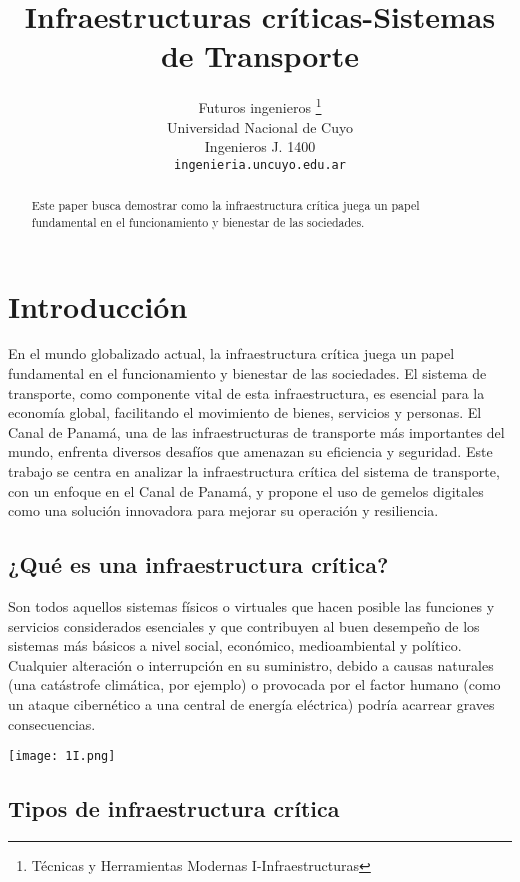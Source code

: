 \documentclass{article}
\title{Infraestructuras críticas-Sistemas de Transporte}
\author{
    Futuros ingenieros
    \thanks{Técnicas y Herramientas Modernas I-Infraestructuras}
   \\
    Universidad Nacional de Cuyo \\
  Ingenieros J. 1400 \\
  \texttt{ingenieria.uncuyo.edu.ar} \\
  }
\begin{document}
\maketitle


\begin{abstract}
Este paper busca demostrar como la infraestructura crítica juega un
papel fundamental en el funcionamiento y bienestar de las sociedades.
\end{abstract}


\pagebreak

\hypertarget{introducciuxf3n}{%
\section{Introducción}\label{introducciuxf3n}}

En el mundo globalizado actual, la infraestructura crítica juega un
papel fundamental en el funcionamiento y bienestar de las sociedades. El
sistema de transporte, como componente vital de esta infraestructura, es
esencial para la economía global, facilitando el movimiento de bienes,
servicios y personas. El Canal de Panamá, una de las infraestructuras de
transporte más importantes del mundo, enfrenta diversos desafíos que
amenazan su eficiencia y seguridad. Este trabajo se centra en analizar
la infraestructura crítica del sistema de transporte, con un enfoque en
el Canal de Panamá, y propone el uso de gemelos digitales como una
solución innovadora para mejorar su operación y resiliencia.

\hypertarget{quuxe9-es-una-infraestructura-cruxedtica}{%
\subsection{¿Qué es una infraestructura
crítica?}\label{quuxe9-es-una-infraestructura-cruxedtica}}

Son todos aquellos sistemas físicos o virtuales que hacen posible las
funciones y servicios considerados esenciales y que contribuyen al buen
desempeño de los sistemas más básicos a nivel social, económico,
medioambiental y político. Cualquier alteración o interrupción en su
suministro, debido a causas naturales (una catástrofe climática, por
ejemplo) o provocada por el factor humano (como un ataque cibernético a
una central de energía eléctrica) podría acarrear graves consecuencias.

\texttt{[image: 1I.png]}

\hypertarget{tipos-de-infraestructura-cruxedtica}{%
\subsection{Tipos de infraestructura
crítica}\label{tipos-de-infraestructura-cruxedtica}}
\end{document}
